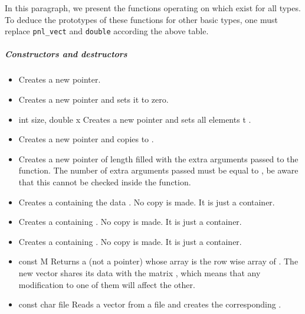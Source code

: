 In this paragraph, we present the functions operating on 
which exist for all types. To deduce the prototypes of these functions for
other basic types, one must replace {\tt pnl_vect} and {\tt double} according
the above table. 
\subparagraph{Constructors and destructors}
\begin{itemize}
\item {}
  \sshortdescribe Creates a new  pointer.  
\item {}
  \sshortdescribe Creates a new  pointer and sets it to zero.  
\item {}
  {int size, double x}
  \sshortdescribe Creates a new  pointer and sets all
  elements t .  
\item {}
  \sshortdescribe Creates a new  pointer and copies 
  to .  
\item {}
  \sshortdescribe Creates a new  pointer of length
   filled with the extra arguments passed to the function. The
  number of extra arguments passed must be equal to , be aware that
  this cannot be checked inside the function.
\item {}
    \sshortdescribe Creates a  containing the data 
  . No copy is made. It is just a container.
  
\item {}
  \sshortdescribe Creates a  containing . No
  copy is made. It is just a container.

\item {}
  \sshortdescribe Creates a  containing . No
  copy is made. It is just a container.

\item {}
  {const  \ptr M}
  \sshortdescribe Returns a  (not a pointer) whose array is
  the row wise array of . The new vector shares its data with the
  matrix , which means that any modification to one of them will affect
  the other.
\item {}
  {const char \ptr file}
  \sshortdescribe Reads a vector from a file and creates the corresponding
  .  


\end{itemize}
